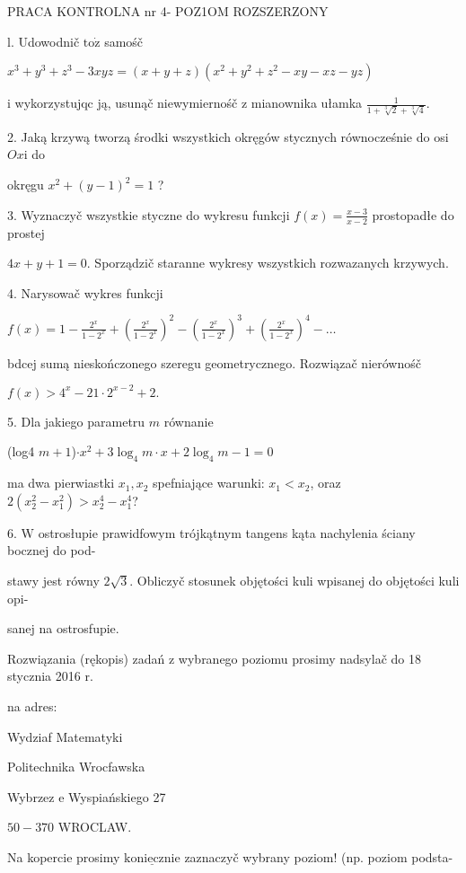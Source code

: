 \documentclass[a4paper,12pt]{article}
\begin{document}
PRACA KONTROLNA nr 4- POZ1OM ROZSZERZONY

l. Udowodnič $\mathrm{t}\mathrm{o}\dot{\mathrm{z}}$ samośč

$x^{3}+y^{3}+z^{3}-3xyz=(x+y+z)(x^{2}+y^{2}+z^{2}-xy-xz-yz)$

$\mathrm{i}$ wykorzystujqc ją, usunąč niewymiernośč $\mathrm{z}$ mianownika ułamka $\displaystyle \frac{1}{1+\sqrt[3]{2}+\sqrt[3]{4}}.$

2. Jaką krzywą tworzą środki wszystkich okręgów stycznych równocześnie do osi $Ox\mathrm{i}$ do

okręgu $x^{2}+(y-1)^{2}=1$ ?

3. Wyznaczyč wszystkie styczne do wykresu funkcji $f(x)=\displaystyle \frac{x-3}{x-2}$ prostopadłe do prostej

$4x+y+1=0$. Sporządzič staranne wykresy wszystkich rozwazanych krzywych.

4. Narysowač wykres funkcji

$ f(x)=1-\displaystyle \frac{2^{x}}{1-2^{x}}+(\frac{2^{x}}{1-2^{x}})^{2}-(\frac{2^{x}}{1-2^{x}})^{3}+(\frac{2^{x}}{1-2^{x}})^{4}-\ldots$

bdcej sumą nieskończonego szeregu geometrycznego. Rozwiązač nierównośč

$f(x)>4^{x}-21\cdot 2^{x-2}+2.$

5. Dla jakiego parametru $m$ równanie

(log4 $m+1$)$\cdot x^{2}+3\log_{4}m\cdot x+2\log_{4}m-1=0$

ma dwa pierwiastki $x_{1}, x_{2}$ spefniające warunki: $x_{1}<x_{2}$, oraz $2(x_{2}^{2}-x_{1}^{2})>x_{2}^{4}-x_{1}^{4}$?

6. $\mathrm{W}$ ostrosłupie prawidfowym trójkątnym tangens kąta nachylenia ściany bocznej do pod-

stawy jest równy $2\sqrt{3}$. Obliczyč stosunek objętości kuli wpisanej do objętości kuli opi-

sanej na ostrosfupie.

Rozwiązania (rękopis) zadań z wybranego poziomu prosimy nadsylač do 18 stycznia 2016 r.

na adres:

Wydziaf Matematyki

Politechnika Wrocfawska

Wybrzez $\mathrm{e}$ Wyspiańskiego 27

$50-370$ WROCLAW.

Na kopercie prosimy $\underline{\mathrm{k}\mathrm{o}\mathrm{n}\mathrm{i}\mathrm{e}\mathrm{c}\mathrm{z}\mathrm{n}\mathrm{i}\mathrm{e}}$ zaznaczyč wybrany poziom! (np. poziom podsta-
\end{document}
